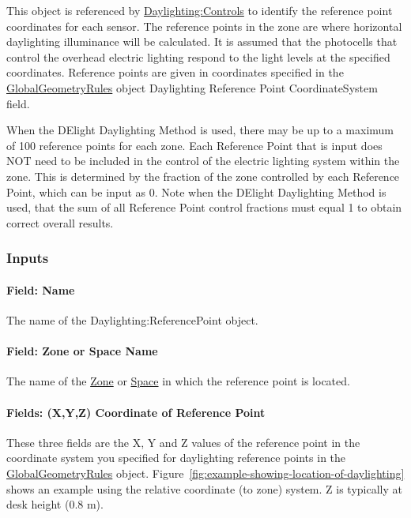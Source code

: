 This object is referenced by \hyperref[daylightingcontrols-000]{Daylighting:Controls} to identify the reference point coordinates for each sensor. The reference points in the zone are where horizontal daylighting illuminance will be calculated. It is assumed that the photocells that control the overhead electric lighting respond to the light levels at the specified coordinates. Reference points are given in coordinates specified in the \hyperref[globalgeometryrules]{GlobalGeometryRules} object Daylighting Reference Point CoordinateSystem field.

When the DElight Daylighting Method is used, there may be up to a maximum of 100 reference points for each zone. Each Reference Point that is input does NOT need to be included in the control of the electric lighting system within the zone. This is determined by the fraction of the zone controlled by each Reference Point, which can be input as 0. Note when the DElight Daylighting Method is used, that the sum of all Reference Point control fractions must equal 1 to obtain correct overall results.

\subsubsection{Inputs}\label{inputs-010}

\paragraph{Field: Name}\label{field-name-002}

The name of the Daylighting:ReferencePoint object.

\paragraph{Field: Zone or Space Name}\label{daylightingreferencepoint-field-zone-name}

The name of the \hyperref[zone]{Zone} or \hyperref[space]{Space} in which the reference point is located.

\paragraph{Fields: (X,Y,Z) Coordinate of Reference Point}\label{fields-xyz-of-reference-point}

These three fields are the X, Y and Z values of the reference point in the coordinate system you specified for daylighting reference points in the \hyperref[globalgeometryrules]{GlobalGeometryRules} object. Figure~\ref{fig:example-showing-location-of-daylighting} shows an example using the relative coordinate (to zone) system. Z is typically at desk height (0.8 m).

